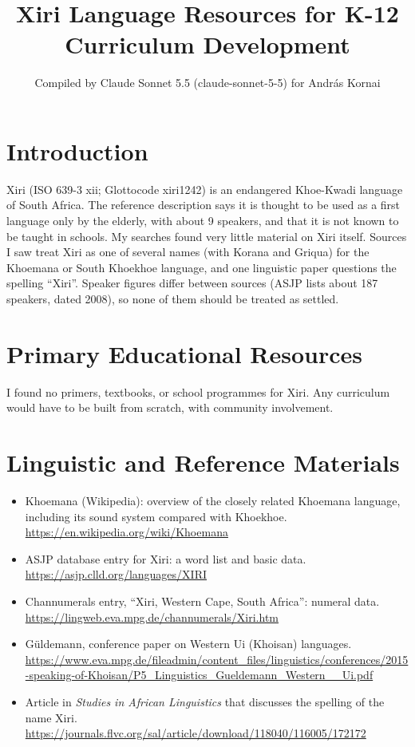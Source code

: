\documentclass[12pt]{article}
\title{Xiri Language Resources for K-12 Curriculum Development}
\author{Compiled by Claude Sonnet 5.5 (claude-sonnet-5-5) for Andr\'as Kornai}
\date{}
\begin{document}
\maketitle

\section{Introduction}
Xiri (ISO 639-3 xii; Glottocode xiri1242) is an endangered Khoe-Kwadi language of South Africa. The reference description says it is thought to be used as a first language only by the elderly, with about 9 speakers, and that it is not known to be taught in schools. My searches found very little material on Xiri itself. Sources I saw treat Xiri as one of several names (with Korana and Griqua) for the Khoemana or South Khoekhoe language, and one linguistic paper questions the spelling ``Xiri''. Speaker figures differ between sources (ASJP lists about 187 speakers, dated 2008), so none of them should be treated as settled.

\section{Primary Educational Resources}
I found no primers, textbooks, or school programmes for Xiri. Any curriculum would have to be built from scratch, with community involvement.

\section{Linguistic and Reference Materials}
\begin{itemize}
\item Khoemana (Wikipedia): overview of the closely related Khoemana language, including its sound system compared with Khoekhoe. \url{https://en.wikipedia.org/wiki/Khoemana}
\item ASJP database entry for Xiri: a word list and basic data. \url{https://asjp.clld.org/languages/XIRI}
\item Channumerals entry, ``Xiri, Western Cape, South Africa'': numeral data. \url{https://lingweb.eva.mpg.de/channumerals/Xiri.htm}
\item G\"uldemann, conference paper on Western Ui (Khoisan) languages. \url{https://www.eva.mpg.de/fileadmin/content_files/linguistics/conferences/2015-speaking-of-Khoisan/P5_Linguistics_Gueldemann_Western__Ui.pdf}
\item Article in \emph{Studies in African Linguistics} that discusses the spelling of the name Xiri. \url{https://journals.flvc.org/sal/article/download/118040/116005/172172}
\end{itemize}
\end{document}
